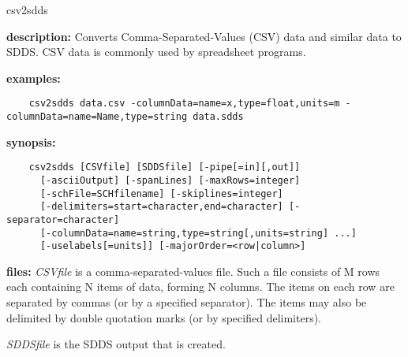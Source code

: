\begin{sddsprog}{csv2sdds}
  \item {\bf description:} Converts Comma-Separated-Values (CSV) data and similar data to SDDS. CSV data is commonly used by spreadsheet programs.
  \item {\bf examples:}
    \begin{verbatim}
    csv2sdds data.csv -columnData=name=x,type=float,units=m -columnData=name=Name,type=string data.sdds
    \end{verbatim}
  \item {\bf synopsis:}
    \begin{verbatim}
    csv2sdds [CSVfile] [SDDSfile] [-pipe[=in][,out]]
      [-asciiOutput] [-spanLines] [-maxRows=integer]
      [-schFile=SCHfilename] [-skiplines=integer]
      [-delimiters=start=character,end=character] [-separator=character]
      [-columnData=name=string,type=string[,units=string] ...]
      [-uselabels[=units]] [-majorOrder=<row|column>]
    \end{verbatim}
  \item {\bf files:}
    {\em CSVfile} is a comma-separated-values file. Such a file consists of M rows each containing
    N items of data, forming N columns. The items on each row are separated by commas (or by a
    specified separator). The items may also be delimited by double quotation marks (or by specified
    delimiters).

    {\em SDDSfile} is the SDDS output that is created.


\end{sddsprog}
